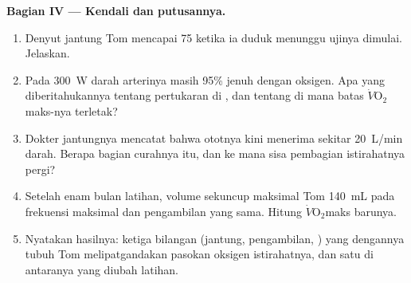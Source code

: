 \begin{problem}
\medskip
\noindent\textbf{Bagian IV --- Kendali dan putusannya.}
\begin{enumerate}[resume]
  \item Denyut jantung Tom mencapai 75 ketika ia duduk menunggu ujinya
        dimulai. Jelaskan.
  \item Pada \qty{300}{W} darah arterinya masih 95\% jenuh dengan
        oksigen. Apa yang diberitahukannya tentang pertukaran di
        , dan tentang di mana batas
        $\dot V\!\mathrm{O_2}$maks-nya terletak?
  \item Dokter jantungnya mencatat bahwa ototnya kini menerima sekitar
        \qty{20}{L/min} darah. Berapa bagian curahnya itu, dan ke mana
        sisa pembagian istirahatnya pergi?
  \item Setelah enam bulan latihan, volume sekuncup maksimal Tom
        \qty{140}{mL} pada frekuensi maksimal dan pengambilan yang
        sama. Hitung $\dot V\!\mathrm{O_2}$maks barunya.
  \item Nyatakan hasilnya: ketiga bilangan (jantung, pengambilan,
        ) yang dengannya tubuh Tom melipatgandakan pasokan
        oksigen istirahatnya, dan satu di antaranya yang diubah latihan.
\end{enumerate}
\end{problem}
